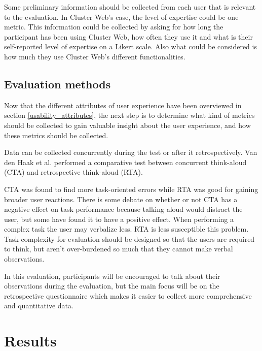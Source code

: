 Some preliminary information should be collected from each user that is relevant to the evaluation. In Cluster Web's case, the level of expertise could be one metric. This information could be collected by asking for how long the participant has been using Cluster Web, how often they use it and what is their self-reported level of expertise on a Likert scale. \cite{likert1932technique} Also what could be considered is how much they use Cluster Web's different functionalities.

\cite{rubin2008handbook, albert2013measuring}

\subsection{Evaluation methods}
Now that the different attributes of user experience have been overviewed in section \ref{usability_attributes}, the next step is to determine what kind of metrics should be collected to gain valuable insight about the user experience, and how these metrics should be collected.

Data can be collected concurrently during the test or after it retrospectively. Van den Haak et al. performed a comparative test between concurrent think-aloud (CTA) and retrospective think-aloud (RTA).

CTA was found to find more task-oriented errors while RTA was good for gaining broader user reactions. There is some debate on whether or not CTA has a negative effect on task performance because talking aloud would distract the user, but some have found it to have a positive effect. When performing a complex task the user may verbalize less. RTA is less susceptible this problem. Task complexity for evaluation should be designed so that the users are required to think, but aren't over-burdened so much that they cannot make verbal observations.
\cite{van2003retrospective}

In this evaluation, participants will be encouraged to talk about their observations during the evaluation, but the main focus will be on the retrospective questionnaire which makes it easier to collect more comprehensive and quantitative data.


\cite{laugwitz2008construction, bevanevaluation, rubin2008handbook, albert2013measuring}




\section{Results}
